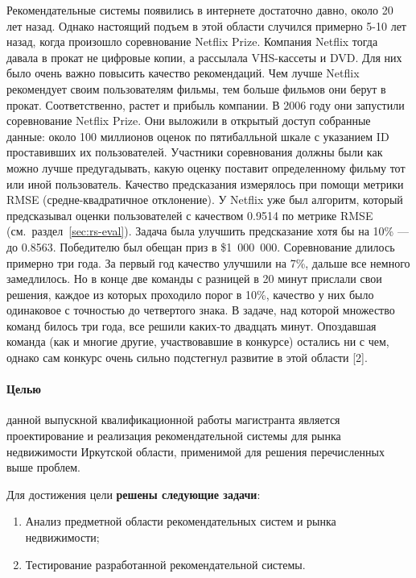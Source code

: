 \documentclass[a4paper,14pt,openany,final]{extreport} %
\begin{document}
Рекомендательные системы появились в интернете достаточно давно, около 20 лет назад. Однако настоящий подъем в этой области случился примерно 5-10 лет назад, когда произошло соревнование Netflix Prize. Компания Netflix тогда давала в прокат не цифровые копии, а рассылала VHS-кассеты и DVD. Для них было очень важно повысить качество рекомендаций. Чем лучше Netflix рекомендует своим пользователям фильмы, тем больше фильмов они берут в прокат. Соответственно, растет и прибыль компании. В 2006 году они запустили соревнование Netflix Prize. Они выложили в открытый доступ собранные данные: около 100 миллионов оценок по пятибалльной шкале с указанием ID проставивших их пользователей. Участники соревнования должны были как можно лучше предугадывать, какую оценку поставит определенному фильму тот или иной пользователь. Качество предсказания измерялось при помощи метрики RMSE (средне-квадратичное отклонение). У Netflix уже был алгоритм, который предсказывал оценки пользователей с качеством 0.9514 по метрике RMSE (см.~раздел~\ref{sec:rs-eval}). Задача была улучшить предсказание хотя бы на 10\% — до 0.8563. Победителю был обещан приз в \$1~000~000. Соревнование длилось примерно три года. За первый год качество улучшили на 7\%, дальше все немного замедлилось. Но в конце две команды с разницей в 20 минут прислали свои решения, каждое из которых проходило порог в 10\%, качество у них было одинаковое с точностью до четвертого знака. В задаче, над которой множество команд билось три года, все решили каких-то двадцать минут. Опоздавшая команда (как и многие другие, участвовавшие в конкурсе) остались ни с чем, однако сам конкурс очень сильно подстегнул развитие в этой области [2].


\paragraph{Целью}\hspace{-1em} данной выпускной квалификационной работы магистранта является проектирование и реализация рекомендательной системы для рынка недвижимости Иркутской области, применимой для решения перечисленных выше проблем.

Для достижения цели \textbf{решены следующие задачи}:
\begin{enumerate}
\item Анализ предметной области рекомендательных систем и рынка недвижимости;
\item Тестирование разработанной рекомендательной системы.
\end{enumerate}
\end{document}
